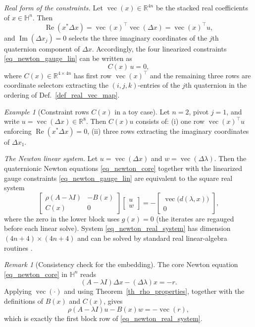 \documentclass[preprint,12pt]{elsarticle}  %
\theoremstyle{definition}
\theoremstyle{definition}
\theoremstyle{definition}
\theoremstyle{definition}
\theoremstyle{definition}
\theoremstyle{remark}
\newtheorem{Rem}{Remark}
\theoremstyle{remark}
\newtheorem{Ex}{Example}
\theoremstyle{remark}
\DeclareRobustCommand{\i}{\ensuremath{\mathbf{i}}}
\DeclareRobustCommand{\j}{\ensuremath{\mathbf{j}}}
\DeclareRobustCommand{\k}{\ensuremath{\mathbf{k}}}
\def\i{i}\def\j{j}\def\k{k}%
\renewcommand{\Re}{\operatorname{Re}}
\renewcommand{\Im}{\operatorname{Im}}
\newcommand{\RR}{\mathbb{R}}
\newcommand{\HH}{\mathbb{H}}
\DeclareMathOperator{\rvec}{vec}
\begin{document}
\noindent\emph{Real form of the constraints.}
Let $\rvec(x)\in\RR^{4n}$ be the stacked real coefficients of $x\in\HH^n$. Then
\[
\Re(x^\ast\Delta x)=\rvec(x)^\top \rvec(\Delta x)=\rvec(x)^\top u,
\]
and $\Im(\Delta x_j)=0$ selects the three imaginary coordinates of the $j$th quaternion component of $\Delta x$.
Accordingly, the four linearized constraints \eqref{eq_newton_gauge_lin} can be written as
\begin{equation}
\label{eq_Cx_def}
C(x)\,u=0,
\end{equation}
where $C(x)\in\RR^{4\times4n}$ has first row $\rvec(x)^\top$ and the remaining three rows are coordinate selectors
extracting the $(\i,\j,\k)$-entries of the $j$th quaternion in the ordering of Def.~\ref{def_real_vec_map}.

\begin{Ex}[Constraint rows $C(x)$ in a toy case]
\label{ex_Cx_toy}
Let $n=2$, pivot $j=1$, and write $u=\rvec(\Delta x)\in\RR^8$. Then $C(x)u$ consists of:
(i) one row $\rvec(x)^\top u$ enforcing $\Re(x^\ast\Delta x)=0$,
(ii) three rows extracting the imaginary coordinates of $\Delta x_1$.
\end{Ex}

\noindent\emph{The Newton linear system.}
Let $u=\rvec(\Delta x)$ and $w=\rvec(\Delta\lambda)$. Then the quaternionic Newton equations
\eqref{eq_newton_core} together with the linearized gauge constraints \eqref{eq_newton_gauge_lin}
are equivalent to the square real system
\begin{equation}
\label{eq_newton_real_system}
\begin{bmatrix}
\rho(A-\lambda I) & -B(x)\\
C(x)              &  0
\end{bmatrix}
\begin{bmatrix}
u\\ w
\end{bmatrix}
=
-
\begin{bmatrix}
\rvec\bigl(d(\lambda,x)\bigr)\\ 0
\end{bmatrix},
\end{equation}
where the zero in the lower block uses $g(x)=0$ (the iterates are regauged before each linear solve).
System \eqref{eq_newton_real_system} has dimension $(4n+4)\times(4n+4)$ and can be solved by standard real linear-algebra
routines \cite{Zhang1997,Rodman2014,FarenickPidkowich2003}.

\begin{Rem}[Consistency check for the embedding]
\label{rem_newton_real_consistency}
The core Newton equation \eqref{eq_newton_core} in $\HH^n$ reads
\[
(A-\lambda I)\Delta x-(\Delta\lambda)x=-r.
\]
Applying $\rvec(\cdot)$ and using Theorem~\ref{th_rho_properties}, together with the definitions of $B(x)$ and $C(x)$,
gives
\[
\rho(A-\lambda I)u-B(x)w=-\rvec(r),
\]
which is exactly the first block row of \eqref{eq_newton_real_system}.
\end{Rem}
\end{document}
